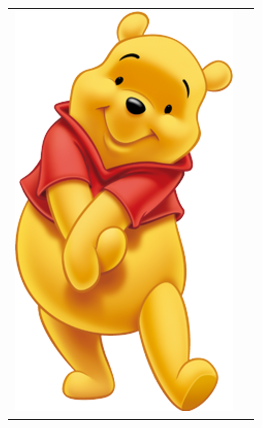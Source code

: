 \documentclass[12pt]{article}
\begin{document}
\begin{tabular}{ c c }
  \includegraphics[scale=0.5]{Winnie-The-Pooh-psd58477.png} \\ %
\end{tabular}
\end{document}
